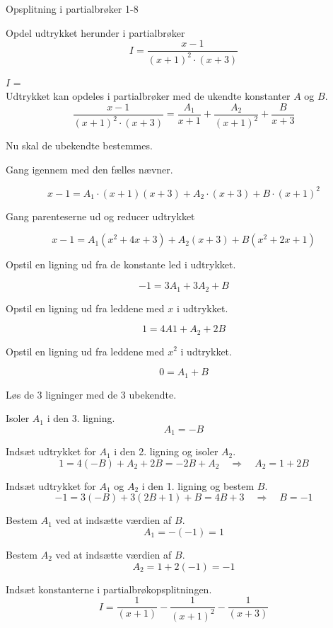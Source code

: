 \documentclass{article}
\begin{document}
\begin{exercise}{Opsplitning i partialbrøker 1-8}
	
	Opdel udtrykket herunder i partialbrøker
	\[
	I = \frac{x - 1}{(x + 1)^2 \cdot (x + 3)}
	\]
	
	$I$ =  \\
	
	\hint
	Udtrykket kan opdeles i partialbrøker med de ukendte konstanter $A$ og $B$.
	\[
	\frac{x - 1}{(x + 1)^2 \cdot (x + 3)} = 
	\frac{A_1}{x + 1} + \frac{A_2}{(x+1)^2} + \frac{B}{x + 3}
	\]
	
	\hint
	Nu skal de ubekendte bestemmes.
	
	\hint
	Gang igennem med den fælles nævner.
	
	\hint
	\[
	x-1 = A_1 \cdot (x + 1)(x+3) + A_2 \cdot (x+3)  + B \cdot (x + 1)^2
	\]
	
	\hint
	Gang parenteserne ud og reducer udtrykket
	
	\hint
	\[
	x - 1 = A_1(x^2 + 4x + 3) + A_2(x+3) + B(x^2 + 2x + 1)
	\]
	
	\hint
	Opstil en ligning ud fra de konstante led i udtrykket.
	
	\hint
	\[
	-1 = 3A_1 + 3A_2 + B
	\]
	
	\hint
	Opstil en ligning ud fra leddene med $x$ i udtrykket.
	
	\hint
	\[
	1 = 4A1 + A_2 + 2B
	\]
	
	\hint
	Opstil en ligning ud fra leddene med $x^2$ i udtrykket.
	
	\hint
	\[
	0 = A_1 + B
	\]
	
	\hint
	Løs de 3 ligninger med de 3 ubekendte.
	
	\hint
	Isoler $A_1$ i den 3. ligning.
	\[
	A_1  =  -B
	\]
	
	\hint
	Indsæt udtrykket for $A_1$ i den 2. ligning og isoler $A_2$.
	\[
	1 = 4(-B) + A_2 + 2B = -2B + A_2 \quad	\Rightarrow 	\quad A_2 = 1 + 2B
	\]
	
	\hint
	Indsæt udtrykket for $A_1$ og $A_2$ i den 1. ligning og bestem $B$.
	\[
	-1= 3(-B) + 3(2B+1) + B = 4B + 3	\quad 	\Rightarrow 		\quad B =  -1
	\]
	
	\hint
	Bestem $A_1$ ved at indsætte værdien af $B$.
	\[
	A_1 = - (-1) = 1 
	\]
	
	\hint
	Bestem $A_2$ ved at indsætte værdien af $B$.
	\[
	A_2 = 1 + 2(-1) = -1
	\]
	
	\hint
	Indsæt konstanterne i partialbrøkopsplitningen.
	\[
	I = \frac{1}{(x+1)} - \frac{1}{(x+1)^2} - \frac{1}{(x+3)}
	\]
	
	
	
\end{exercise}
\end{document}

